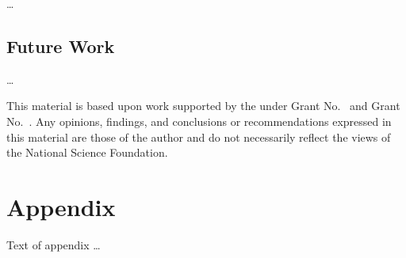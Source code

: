 \documentclass[acmsmall,review,anonymous]{acmart}\settopmatter{printfolios=true,printccs=false,printacmref=false}
\begin{document}
\ldots

\subsection{Future Work}

\ldots

\begin{acks}                            %
  This material is based upon work supported by the
   under Grant
  No.~ and Grant
  No.~.  Any opinions, findings, and
  conclusions or recommendations expressed in this material are those
  of the author and do not necessarily reflect the views of the
  National Science Foundation.
\end{acks}




\appendix
\section{Appendix}

Text of appendix \ldots
\end{document}
